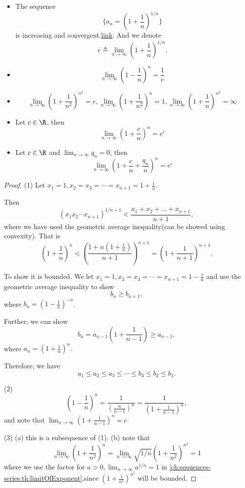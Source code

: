 \begin{refsection}
\begin{lemma}
\begin{itemize}
	\item The sequence $$\{a_n = (1 +\frac{1}{n})^{1/n}\}$$
	is increasing and convergent.\href{https://math.stackexchange.com/questions/167843/i-have-to-show-1-frac1nn-is-monotonically-increasing-sequence/704506#704506}{link}. And we denote 
	$$e\triangleq \lim_{n\to \infty } (1 +\frac{1}{n})^{1/n}.$$
	\item 
	$$\lim_{n\to \infty} (1 - \frac{1}{n})^n = \frac{1}{e}$$
	\item 
	$$\lim_{n\to \infty} (1 + \frac{1}{n^2})^{n^2} = e,\lim_{n\to \infty} (1 + \frac{1}{n^2})^n = 1, \lim_{n\to \infty} (1 + \frac{1}{n})^{n^2} = \infty $$
	
	\item Let $c\in \R$, then
	$$\lim_{n\to \infty} (1 + \frac{c}{n})^n = e^c$$
	\item Let $c\in \R$ and $\lim_{n\to\infty} q_n = 0$, then
	$$\lim_{n\to \infty} (1 + \frac{c}{n} + \frac{q_n}{n})^n = e^c$$
	
\end{itemize}


\end{lemma}
\begin{proof}
(1)  
Let $x_1 = 1, x_2=x_3=\cdots = x_{n+1} = 1 + \frac{1}{n}.$

Then
$$(x_1x_2\cdots x_{n+1})^{1/n+1} < \frac{x_1+x_2+...+x_{n+1}}{n+1},$$
where we have used the geometric average inequality(can be showed using convexity).
That is
$$(1+\frac{1}{n})^{n} < (\frac{1 + n(1+\frac{1}{n})}{n+1})^{n+1} = (1 + \frac{1}{n+1})^{n+1}.$$

To show it is bounded. We let $x_1 = 1, x_2=x_3=\cdots = x_{n+1} = 1 - \frac{1}{n}$ and use the geometric average inequality to show
$$b_n \geq b_{n+1},$$
where $b_n = (1 - \frac{1}{n})^{-n}$. 

Further, we can show 
$$b_n = a_{n-1}(1 + \frac{1}{n-1}) \geq a_{n-1},$$
where $a_n = (1 + \frac{1}{n})^n.$

Therefore, we have
$$a_1 \leq a_2  \leq a_3 \leq \cdots \leq b_3 \leq b_2 \leq b_1.$$


(2)	$$ (1 - \frac{1}{n})^n = \frac{1}{(\frac{n}{n-1})^n} = \frac{1}{(1 + \frac{1}{n-1})^n},$$
and note that $\lim_{n\to \infty}(1 + \frac{1}{n-1})^n = e$

(3) (a) this is a subsequence of (1). (b) note that 
$$\lim_{n\to \infty} (1 + \frac{1}{n^2})^n=\lim_{n\to \infty} \sqrt{1/n}{(1 + \frac{1}{n^2})^{n^2}} = 1$$
where we use the factor for $a > 0, \lim_{n\to \infty} a^{1/n} = 1$ in \autoref{ch:sequences-series:th:limitOfExponent},since $(1 + \frac{1}{n^2})^{n^2}$ will be bounded. 
	

\end{proof}
\end{refsection}
